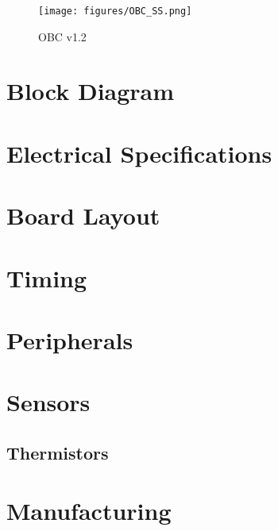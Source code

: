 \documentclass[10pt]{datasheet}
\begin{document}
\begin{figure}[H]
  \centering
  \texttt{[image: figures/OBC\_SS.png]}
  \caption{\centering OBC v1.2}
  \label{fig:enter-label}
\end{figure}

\onecolumn
\section{Block Diagram}

\section{Electrical Specifications}
\section{Board Layout}
\section{Timing}
\section{Peripherals}
\section{Sensors}
\subsection{Thermistors}
\section{Manufacturing}
\end{document}
